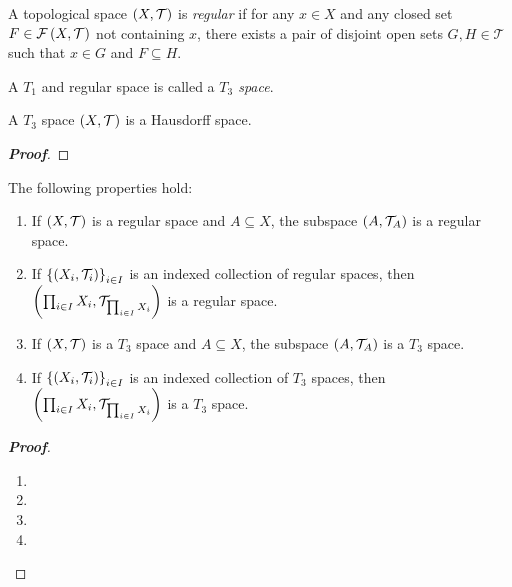 \begin{definition}
  A topological space $\left(X,\mathcal{T}\right)$ is \textit{regular} if for any $x\in X$ and any closed set $F\in\mathcal{F}\left(X,\mathcal{T}\right)$ not containing $x$, there exists a pair of disjoint open sets $G,H\in\mathcal{T}$ such that $x\in G$ and $F\subseteq H$.

  A $T_1$ and regular space is called a \textit{$T_3$ space}.
\end{definition}

\begin{proposition}
  A $T_3$ space $\left(X,\mathcal{T}\right)$ is a Hausdorff space.
  \begin{proof}[\rm\textbf{Proof}]
    
  \end{proof}
\end{proposition}

\begin{proposition}
  The following properties hold:

  \begin{enumerate}
    \item If $\left(X,\mathcal{T}\right)$ is a regular space and $A\subseteq X$, the subspace $\left(A,\mathcal{T}_A\right)$ is a regular space.
    \item If $\left\{\left(X_i,\mathcal{T}_i\right)\right\}_{i\in I}$ is an indexed collection of regular spaces, then $\left(\prod_{i\in I}{X_i},\mathcal{T}_{\prod_{i\in I}{X_i}}\right)$ is a regular space.
    \item If $\left(X,\mathcal{T}\right)$ is a $T_3$ space and $A\subseteq X$, the subspace $\left(A,\mathcal{T}_A\right)$ is a $T_3$ space.
    \item If $\left\{\left(X_i,\mathcal{T}_i\right)\right\}_{i\in I}$ is an indexed collection of $T_3$ spaces, then $\left(\prod_{i\in I}{X_i},\mathcal{T}_{\prod_{i\in I}{X_i}}\right)$ is a $T_3$ space.
  \end{enumerate}
  
  \begin{proof}[\rm\textbf{Proof}]
    \hfill
    \begin{enumerate}
      \item 
      \item 
      \item 
      \item 
    \end{enumerate}
  \end{proof}
\end{proposition}

